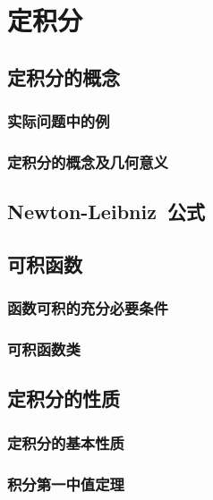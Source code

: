 

\chapter{定积分}\label{ch:7}
\section{定积分的概念}
\subsection{实际问题中的例}
\subsection{定积分的概念及几何意义}
\begin{exercise}
\item
\end{exercise}
\section{Newton-Leibniz~公式}
\begin{exercise}
\item
\end{exercise}
\section{可积函数}
\subsection{函数可积的充分必要条件}
\subsection{可积函数类}
\begin{exercise}
\item
\end{exercise}
\section{定积分的性质}
\subsection{定积分的基本性质}
\subsection{积分第一中值定理}
\begin{exercise}
\item
\end{exercise}
